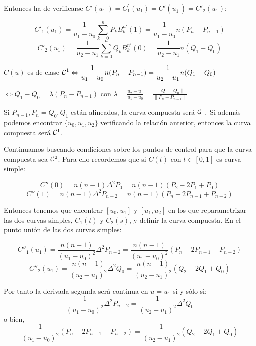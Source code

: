 \documentclass[twoside]{report}
\begin{document}
Entonces ha de verificarse $C'(u_1^{-})=C^{\prime}_1(u_1)=C'(u_1^{+})=C'_2(u_1):$

$$C'_1(u_1)=\frac{1}{u_1-u_0}\sum_{k=0}^n P_k B_k^{n \prime}(1)=\frac{1}{u_1-u_0} n(P_n-P_{n-1})$$
$$C'_2(u_1)=\frac{1}{u_2-u_1}\sum_{k=0}^n Q_k B_k^{n \prime}(0)=\frac{1}{u_2-u_1} n (Q_1-Q_0)$$

$C(u)$ es de clase $\displaystyle {\cal C}^1 \Leftrightarrow \frac{1}{u_1-u_0} n(P_n-P_{n-1})=\frac{1}{u_2-u_1} n (Q_1-Q_0)$

\vspace{0.2cm}

$\displaystyle \Leftrightarrow Q_1-Q_0 = \lambda (P_n-P_{n-1})$ con $\displaystyle \lambda = \frac{u_2-u_1}{u_1-u_0} = \frac{\parallel Q_1-Q_0\parallel}{\parallel P_n-P_{n-1} \parallel}$

\vspace{0.2cm}

Si $P_{n-1}, P_n=Q_0, Q_1$ est\'{a}n alineados, la curva compuesta ser\'{a} ${\cal G}^1.$ Si adem\'{a}s podemos encontrar $\{u_0,u_1,u_2\}$ verificando la relaci\'{o}n anterior, entonces la curva compuesta ser\'{a} ${\cal C}^1$.

%
%
Continuamos buscando condiciones sobre los puntos de control para que la curva compuesta  sea ${\cal C}^2$. Para ello recordemos que si $C(t)$ con $t\in[0,1]$ es curva simple:

$$C''(0)=n(n-1)\Delta^2P_0=n (n-1) (P_2-2P_1+P_0)$$
$$C''(1)=n(n-1)\Delta^2P_{n-2}=n (n-1) (P_n-2P_{n-1}+P_{n-2})$$

Entonces tenemos que encontrar $[u_0,u_1]$ y $[u_1,u_2]$ en los que reparametrizar las dos curvas simples, $C_1(t)$ y $C_2(s)$, y definir la curva compuesta. En el punto uni\'{o}n de las dos curvas simples:

$$C''_1(u_1)=\frac{n(n-1)}{(u_1-u_0)^2}\Delta^2P_{n-2}=\frac{n(n-1)}{(u_1-u_0)^2}(P_n-2P_{n-1}+P_{n-2})$$
$$C''_2(u_1)=\frac{n(n-1)}{(u_2-u_1)^2}\Delta^2Q_0=\frac{n(n-1)}{(u_2-u_1)^2}(Q_2-2Q_1+Q_0)$$

Por tanto la derivada segunda ser\'{a} continua en $u=u_1$ si y s\'{o}lo si:
$$\frac{1}{(u_1-u_0)^2}\Delta^2P_{n-2}=\frac{1}{(u_2-u_1)^2}\Delta^2Q_0$$
o bien,
$$\frac{1}{(u_1-u_0)^2}(P_n-2P_{n-1}+P_{n-2})=\frac{1}{(u_2-u_1)^2}(Q_2-2Q_1+Q_0)$$
\end{document}
